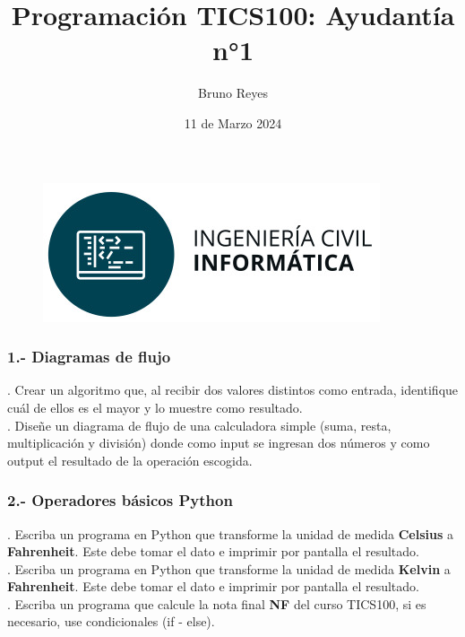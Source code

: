 \documentclass{article}
\begin{document}
\begin{figure}
    \centering
    \includegraphics[width=0.6\linewidth]{../img/logo-informatica.jpeg} 
\end{figure}

\title{Programación TICS100: Ayudantía n°1}
\author{Bruno Reyes}
\date{11 de Marzo 2024}


\maketitle


\subsubsection*{1.- Diagramas de flujo}

. Crear un algoritmo que, al recibir dos valores distintos como entrada, identifique cuál de ellos es el mayor y lo muestre como resultado.\\

. Diseñe un diagrama de flujo de una calculadora simple (suma, resta, multiplicación y división) donde como input se ingresan dos números y como output el resultado de la operación escogida. \\

\subsubsection*{2.- Operadores básicos Python}

. Escriba un programa en Python que transforme la unidad de medida \textbf{Celsius} a \textbf{Fahrenheit}. Este debe tomar el dato e imprimir por pantalla el resultado.\\

. Escriba un programa en Python que transforme la unidad de medida \textbf{Kelvin} a \textbf{Fahrenheit}. Este debe tomar el dato e imprimir por pantalla el resultado.\\

. Escriba un programa que calcule la nota final \textbf{NF} del curso TICS100, si es necesario, use condicionales (if - else).  \\
\end{document}
